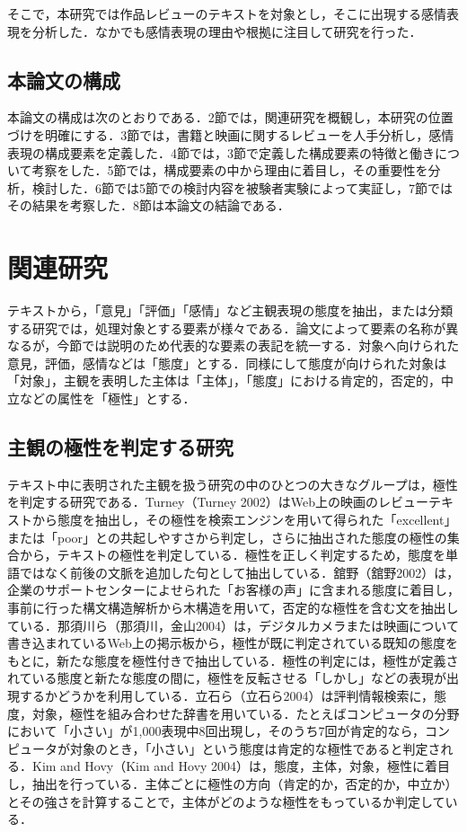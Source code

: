 \documentclass[japanese]{jnlp_1.3a}
\begin{document}
そこで，本研究では作品レビューのテキストを対象とし，そこに出現する感情表現を分析した．なかでも感情表現の理由や根拠に注目して研究を行った．

\subsection{本論文の構成}

本論文の構成は次のとおりである．2節では，関連研究を概観し，本研究の位置づけを明確にする．3節では，書籍と映画に関するレビューを人手分析し，感情表現の構成要素を定義した．4節では，3節で定義した構成要素の特徴と働きについて考察をした．5節では，構成要素の中から理由に着目し，その重要性を分析，検討した．6節では5節での検討内容を被験者実験によって実証し，7節ではその結果を考察した．8節は本論文の結論である．

\section{関連研究}

テキストから，「意見」「評価」「感情」など主観表現の態度を抽出，または分類する研究では，処理対象とする要素が様々である．論文によって要素の名称が異なるが，今節では説明のため代表的な要素の表記を統一する．対象へ向けられた意見，評価，感情などは「態度」とする．同様にして態度が向けられた対象は「対象」，主観を表明した主体は「主体」，「態度」における肯定的，否定的，中立などの属性を「極性」とする．

\subsection{主観の極性を判定する研究}

テキスト中に表明された主観を扱う研究の中のひとつの大きなグループは，極性を判定する研究である．Turney（Turney 2002）はWeb上の映画のレビューテキストから態度を抽出し，その極性を検索エンジンを用いて得られた「excellent」または「poor」との共起しやすさから判定し，さらに抽出された態度の極性の集合から，テキストの極性を判定している．極性を正しく判定するため，態度を単語ではなく前後の文脈を追加した句として抽出している．舘野（舘野2002）は，企業のサポートセンターによせられた「お客様の声」に含まれる態度に着目し，事前に行った構文構造解析から木構造を用いて，否定的な極性を含む文を抽出している．那須川ら（那須川，金山2004）は，デジタルカメラまたは映画について書き込まれているWeb上の掲示板から，極性が既に判定されている既知の態度をもとに，新たな態度を極性付きで抽出している．極性の判定には，極性が定義されている態度と新たな態度の間に，極性を反転させる「しかし」などの表現が出現するかどうかを利用している．立石ら（立石ら2004）は評判情報検索に，態度，対象，極性を組み合わせた辞書を用いている．たとえばコンピュータの分野において「小さい」が1,000表現中8回出現し，そのうち7回が肯定的なら，コンピュータが対象のとき，「小さい」という態度は肯定的な極性であると判定される．Kim and Hovy（Kim and Hovy 2004）は，態度，主体，対象，極性に着目し，抽出を行っている．主体ごとに極性の方向（肯定的か，否定的か，中立か）とその強さを計算することで，主体がどのような極性をもっているか判定している．
\end{document}
